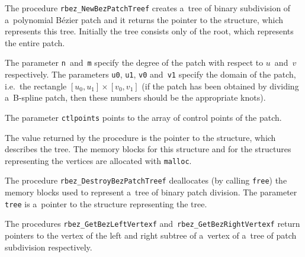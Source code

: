 \newpage
The procedure \texttt{rbez\_NewBezPatchTreef} creates a~tree of binary subdivision
of a~polynomial B\'{e}zier patch and it returns the pointer to the structure,
which represents this tree. Initially the tree consists only of the root,
which represents the entire patch.

The parameter \texttt{n}~and~\texttt{m} specify the degree of the patch
with respect to $u$~and~$v$ respectively. The parameters \texttt{u0},
\texttt{u1}, \texttt{v0} and~\texttt{v1} specify the domain of the patch,
i.e.\ the rectangle $[u_0,u_1]\times[v_0,v_1]$ (if the patch has been
obtained by dividing a~B-spline patch, then these numbers should be
the appropriate knots).

The parameter \texttt{ctlpoints} points to the array of control points
of the patch.

The value returned by the procedure is the pointer to the structure,
which describes the tree. The memory blocks for this structure and
for the structures representing the vertices are allocated with
\texttt{malloc}.

\vspace{\bigskipamount}
The procedure \texttt{rbez\_DestroyBezPatchTreef} deallocates (by calling
\texttt{free}) the memory blocks used to represent a~tree of binary
patch division. The parameter \texttt{tree} is a~pointer to the structure
representing the tree.

\vspace{\bigskipamount}
The procedures \texttt{rbez\_GetBezLeftVertexf}
and~\texttt{rbez\_GetBezRightVertexf}
return pointers to the vertex of the left and right subtree of a~vertex of a~tree
of patch subdivision respectively.

